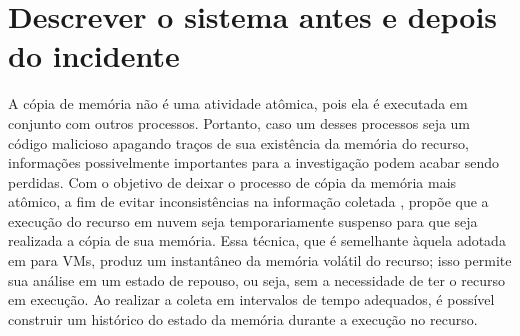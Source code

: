 \section{Descrever o sistema antes e depois do incidente}
\label{sec:proposal-desc-incident}

A cópia de memória não é uma atividade atômica, pois ela é executada em conjunto com outros processos. 
%
Portanto, caso um desses processos seja um código malicioso apagando traços de sua existência da memória do recurso, informações possivelmente importantes para a investigação podem acabar sendo perdidas. 
%
Com o objetivo de deixar o processo de cópia da memória mais atômico, a fim de evitar inconsistências na informação coletada \cite{CaseMemoryForensics:2014}, \fancyname propõe que a execução do recurso em nuvem seja temporariamente suspenso para que seja realizada a cópia de sua memória. 
%
Essa técnica, que é semelhante àquela adotada em \cite{RafiqueStaticLiveDigitalForensics:2013} para VMs, produz um instantâneo da memória volátil do recurso; isso permite sua análise em um estado de repouso, ou seja, sem a necessidade de ter o recurso em execução.
%
Ao realizar a coleta em intervalos de tempo adequados, é possível construir um histórico do estado da memória durante a execução no recurso.
%


